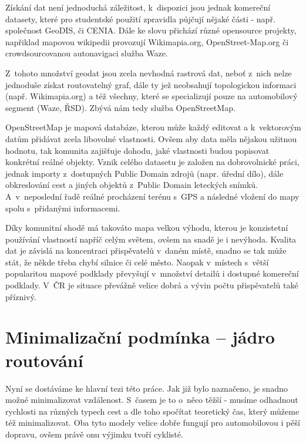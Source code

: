 \documentclass[thesis=B,czech]{FITthesis}[2012/06/26]
\begin{document}
Získání dat není jednoduchá záležitost, k~dispozici jsou jednak komereční datasety, které pro studentské použití zpravidla půjčují nějaké části  - např. společnost GeoDIS, či CENIA. Dále ke slovu přichází různé opensource projekty, napřiklad mapovou wikipedii provozují Wikimapia.org, OpenStreet-Map.org či crowdsourcovanou autonavigaci služba Waze.

Z~tohoto množství geodat jsou zcela nevhodná rastrová dat, neboť z~nich nelze jednoduše získat routovatelný graf, dále ty jež neobsahují topologickou informaci (např. Wikimapia.org) a též všechny, které se specializují pouze na automobilový segment (Waze, ŘSD). Zbývá nám tedy služba OpenStreetMap.

OpenStreetMap je mapová databáze, kterou může každý editovat a k~vektorovým datům přidávat zcela libovolné vlastnosti. Ovšem aby data měla nějakou užitnou hodnotu, tak komunita zajišťuje dohodu, jaké vlastnosti budou popisovat konkrétní reálné objekty. Vznik celého datasetu je založen na dobrovolnické práci, jednak importy z~dostupných Public Domain zdrojů (napr. úřední dílo), dále obkreslování cest a jiných objektů z~Public Domain leteckých snímků. A~v~neposlední řadě reálné procházení terénu s~GPS a následné vložení do mapy spolu s~přidanými informacemi.

Díky komunitní shodě má takováto mapa velkou výhodu, kterou je konzistetní používání vlastností napříč celým světem, ovšem na snadě je i nevýhoda. Kvalita dat je závislá na koncentraci přispěvatelů v~daném místě, snadno se tak může stát, že někde třeba chybí silnice či celé město. Naopak v~místech s~větší popularitou mapové podklady převyšují v~množství detailů i dostupné komereční podklady. V~ČR je situace převážně velice dobrá a vývin počtu přispěvatelů také příznivý.


\section{Minimalizační podmínka -- jádro routování} 
\label{minimalizacniPodminka}


Nyní se dostáváme ke hlavní tezi této práce. Jak již bylo naznačeno, je snadno možné minimalizovat vzdálenost. S~časem je to o~něco těžší - musíme odhadnout rychlosti na různých typech cest a dle toho spočítat teoretický čas, který můžeme též minimalizovat. Oba tyto modely velice dobře fungují pro automobilovou i pěší dopravu, ovšem právě onu výjimku tvoří cyklisté.
\end{document}
